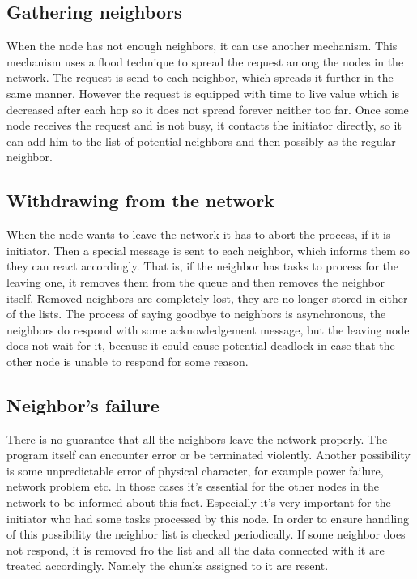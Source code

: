 \subsection*{Gathering neighbors}

When the node has not enough neighbors, it can use another mechanism.
This mechanism uses a flood technique to spread the request among the
nodes in the network. The request is send to each neighbor, which
spreads it further in the same manner. However the request is equipped
with time to live value which is decreased after each hop so it does not
spread forever neither too far. Once some node receives the request and
is not busy, it contacts the initiator directly, so it can add him to
the list of potential neighbors and then possibly as the regular
neighbor.

\subsection*{Withdrawing from the network}

When the node wants to leave the network it has to abort the process, if
it is initiator. Then a special message is sent to each neighbor, which
informs them so they can react accordingly. That is, if the neighbor has
tasks to process for the leaving one, it removes them from the queue and
then removes the neighbor itself. Removed neighbors are completely lost,
they are no longer stored in either of the lists. The process of saying
goodbye to neighbors is asynchronous, the neighbors do respond with some
acknowledgement message, but the leaving node does not wait for it,
because it could cause potential deadlock in case that the other node is
unable to respond for some reason.

\subsection*{Neighbor's failure}

There is no guarantee that all the neighbors leave the network properly.
The program itself can encounter error or be terminated violently.
Another possibility is some unpredictable error of physical character,
for example power failure, network problem etc. In those cases it's
essential for the other nodes in the network to be informed about this
fact. Especially it's very important for the initiator who had some
tasks processed by this node. In order to ensure handling of this
possibility the neighbor list is checked periodically. If some neighbor
does not respond, it is removed fro the list and all the data connected
with it are treated accordingly. Namely the chunks assigned to it are
resent.

